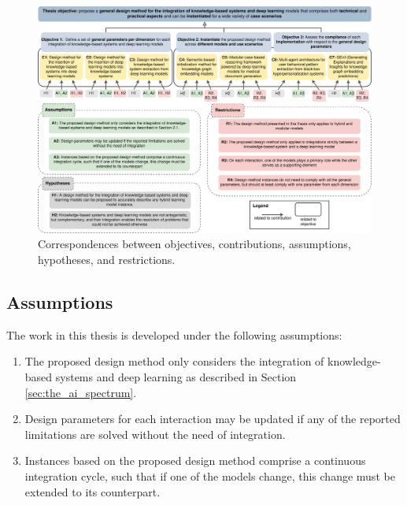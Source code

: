 \begin{figure}
  \centering
  \includegraphics[width=\linewidth]{3_objectives/figures/methodology_general.eps}
  \caption{Correspondences between objectives, contributions, assumptions, hypotheses, and restrictions.}
  \label{fig:methodology_general}
\end{figure}

\subsection{Assumptions}
The work in this thesis is developed under the following assumptions:
\begin{enumerate}[start=1,label={\bfseries A\arabic*:}]
    \item The proposed design method only considers the integration of knowledge-based systems and deep learning as described in Section \ref{sec:the_ai_spectrum}.
    \item Design parameters for each interaction may be updated if any of the reported limitations are solved without the need of integration.
    \item Instances based on the proposed design method comprise a continuous integration cycle, such that if one of the models change, this change must be extended to its counterpart.
\end{enumerate}
